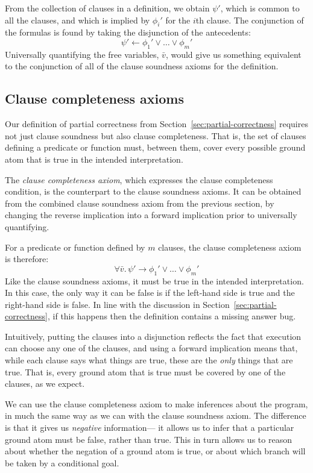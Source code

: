From the collection of clauses in a definition,
we obtain $\psi'$, which is common to all the clauses,
and which is implied by $\phi_i'$ for the $i$th clause.
The conjunction of the formulas is found by
taking the disjunction of the antecedents:
\[
    \psi' \leftarrow \phi_1' \lor \ldots \lor \phi_m'
\]
Universally quantifying the free variables, $\bar{v}$,
would give us something equivalent to
the conjunction of all of the clause soundness axioms
for the definition.


\subsection{Clause completeness axioms}
\label{sec:ax-clause-completeness}

Our definition of partial correctness
from Section~\ref{sec:partial-correctness}
requires not just clause soundness
but also clause completeness.
That is,
the set of clauses defining a predicate or function
must, between them, cover every possible ground atom
that is true in the intended interpretation.

The \emph{clause completeness axiom},
which expresses the clause completeness condition,
is the counterpart to the clause soundness axioms.
It can be obtained from
the combined clause soundness axiom from the previous section,
by changing the reverse implication
into a forward implication
prior to universally quantifying.

For a predicate or function defined by $m$ clauses,
the clause completeness axiom is therefore:
\[
    \forall \bar{v}.\, \psi' \rightarrow \phi_1' \lor \ldots \lor \phi_m'
\]
Like the clause soundness axioms,
it must be true in the intended interpretation.
In this case,
the only way it can be false is if the left-hand side is true
and the right-hand side is false.
In line with the discussion in Section~\ref{sec:partial-correctness},
if this happens then the definition contains a missing answer bug.

Intuitively,
putting the clauses into a disjunction
reflects the fact that execution can choose any one of the clauses,
and using a forward implication means that,
while each clause says what things are true,
these are the \emph{only} things that are true.
That is, every ground atom that is true
must be covered by one of the clauses,
as we expect.

We can use the clause completeness axiom
to make inferences about the program,
in much the same way as
we can with the clause soundness axiom.
The difference is that
it gives us \emph{negative} information---%
it allows us to infer that a particular ground atom must be false,
rather than true.
This in turn allows us to reason about
whether the negation of a ground atom is true,
or about which branch will be taken by a conditional goal.


